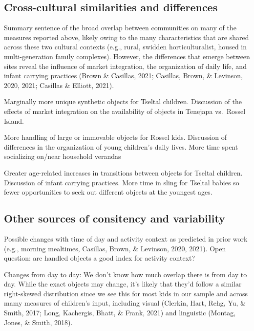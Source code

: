 \documentclass[10pt, letterpaper]{article}
\begin{document}
\hypertarget{cross-cultural-similarities-and-differences}{%
\subsection{Cross-cultural similarities and
differences}\label{cross-cultural-similarities-and-differences}}

Summary sentence of the broad overlap between communities on many of the
measures reported above, likely owing to the many characteristics that
are shared across these two cultural contexts (e.g., rural, swidden
horticulturalist, housed in multi-generation family complexes). However,
the differences that emerge between sites reveal the influence of market
integration, the organization of daily life, and infant carrying
practices (Brown \& Casillas, 2021; Casillas, Brown, \& Levinson, 2020,
2021; Casillas \& Elliott, 2021).

Marginally more unique synthetic objects for Tseltal children.
Discussion of the effects of market integration on the availability of
objects in Tenejapa vs.~Rossel Island.

More handling of large or immovable objects for Rossel kids. Discussion
of differences in the organization of young children's daily lives. More
time spent socializing on/near household verandas

Greater age-related increases in transitions between objects for Tseltal
children. Discussion of infant carrying practices. More time in sling
for Tseltal babies so fewer opportunities to seek out different objects
at the youngest ages.

\hypertarget{other-sources-of-consitency-and-variability}{%
\subsection{Other sources of consitency and
variability}\label{other-sources-of-consitency-and-variability}}

Possible changes with time of day and activity context as predicted in
prior work (e.g., morning mealtimes, Casillas, Brown, \& Levinson, 2020,
2021). Open question: are handled objects a good index for activity
context?

Changes from day to day: We don't know how much overlap there is from
day to day. While the exact objects may change, it's likely that they'd
follow a similar right-skewed distribution since we see this for most
kids in our sample and across mamy measures of children's input,
including visual (Clerkin, Hart, Rehg, Yu, \& Smith, 2017; Long,
Kachergis, Bhatt, \& Frank, 2021) and linguistic (Montag, Jones, \&
Smith, 2018).
\end{document}
